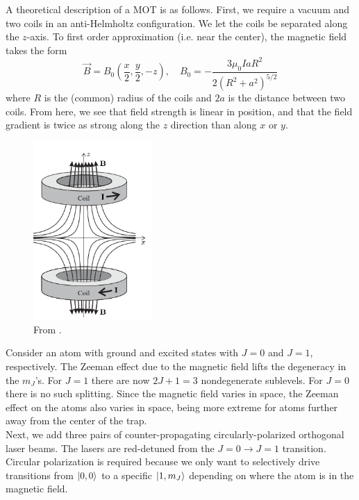 \documentclass{book}
\theoremstyle{definition}
\newcommand{\f}[2]{\frac{#1}{#2}}
\newcommand{\lp}{\left(}
\newcommand{\rp}{\right)}
\begin{document}
A theoretical description of a MOT is as follows. First, we require a vacuum and two coils in an anti-Helmholtz configuration. We let the coils be separated along the $z$-axis. To first order approximation (i.e. near the center), the magnetic field takes the form
\begin{equation*}
\vec{B} = B_0 \lp \f{x}{2}, \f{y}{2}, -z \rp, \quad B_0 = -\f{3\mu_0 I a R^2}{2(R^2 + a^2)^{5/2}}
\end{equation*}
where $R$ is the (common) radius of the coils and $2a$ is the distance between two coils. From here, we see that field strength is linear in position, and that the field gradient is twice as strong along the $z$ direction than along $x$ or $y$. 


\begin{figure}[!htb]
	\centering
	\includegraphics[width=0.4\textwidth]{images/anti-helmholtz}
	\caption{From \cite{foot2005atomic}.}
\end{figure}

Consider an atom with ground and excited states with $J=0$ and $J=1$, respectively. The Zeeman effect due to the magnetic field lifts the degeneracy in the $m_J$'s. For $J=1$ there are now $2J+1 = 3$ nondegenerate sublevels. For $J=0$ there is no such splitting. Since the magnetic field varies in space, the Zeeman effect on the atoms also varies in space, being more extreme for atoms further away from the center of the trap. \\


Next, we add three pairs of counter-propagating circularly-polarized orthogonal laser beams. The lasers are red-detuned from the $J=0 \to J=1$ transition. Circular polarization is required because we only want to selectively drive transitions from $\ket{0,0}$ to a specific $\ket{1,m_J}$ depending on where the atom is in the magnetic field. \\
\end{document}
